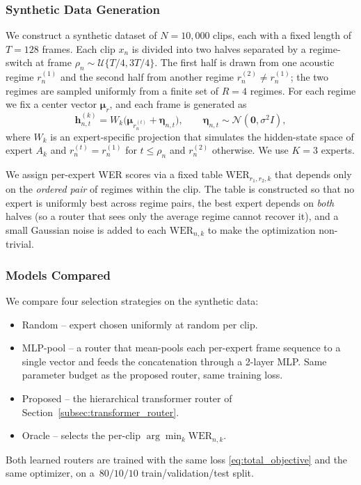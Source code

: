 \documentclass[journal]{IEEEtran}
\begin{document}
\subsubsection{Synthetic Data Generation}

We construct a synthetic dataset of $N=10{,}000$ clips, each with a
fixed length of $T=128$ frames. Each clip $x_n$ is divided into two
halves separated by a regime-switch at frame $\rho_n\sim\mathcal{U}\{T/4,3T/4\}$.
The first half is drawn from one acoustic regime $r_n^{(1)}$ and the
second half from another regime $r_n^{(2)}\neq r_n^{(1)}$; the two
regimes are sampled uniformly from a finite set of $R=4$ regimes.
For each regime we fix a center vector $\boldsymbol{\mu}_r$, and each
frame is generated as
\[
\mathbf{h}_{n,t}^{(k)} =
W_k\bigl(\boldsymbol{\mu}_{r_n^{(t)}}+\boldsymbol{\eta}_{n,t}\bigr),
\qquad
\boldsymbol{\eta}_{n,t}\sim\mathcal{N}(\mathbf{0},\sigma^2 I),
\]
where $W_k$ is an expert-specific projection that simulates the
hidden-state space of expert $A_k$ and $r_n^{(t)}=r_n^{(1)}$ for
$t\le\rho_n$ and $r_n^{(2)}$ otherwise. We use $K=3$ experts.

We assign per-expert WER scores via a fixed table
$\mathrm{WER}_{r_1,r_2,k}$ that depends only on the \emph{ordered
pair} of regimes within the clip. The table is constructed so that
no expert is uniformly best across regime pairs, the best expert
depends on \emph{both} halves (so a router that sees only the
average regime cannot recover it), and a small Gaussian noise is
added to each $\mathrm{WER}_{n,k}$ to make the optimization
non-trivial.

\subsubsection{Models Compared}

We compare four selection strategies on the synthetic data:
\begin{itemize}
    \item Random -- expert chosen uniformly at random per clip.
    \item MLP-pool -- a router that mean-pools each per-expert frame
    sequence to a single vector and feeds the concatenation through
    a 2-layer MLP. Same parameter budget as the proposed router,
    same training loss.
    \item Proposed -- the hierarchical transformer router of
    Section~\ref{subsec:transformer_router}.
    \item Oracle -- selects the per-clip
    $\arg\min_k\mathrm{WER}_{n,k}$.
\end{itemize}
Both learned routers are trained with the same loss
\eqref{eq:total_objective} and the same optimizer, on a $\,80/10/10$
train/validation/test split.
\end{document}
